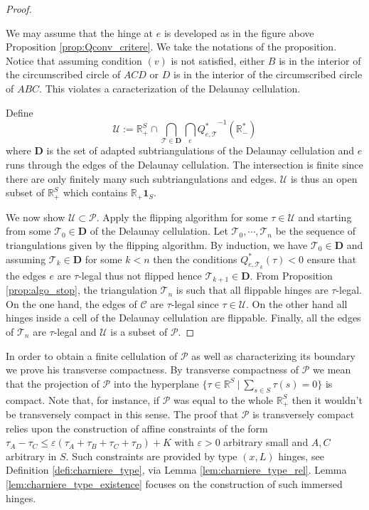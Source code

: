 \documentclass[a4paper,12pt]{article}
\def\U{\mathcal U}
\def\TT{\mathcal T}
\def\adm{\P}
\def\RR{\mathbb{R}}
\def\Cell{\mathcal C}
\def\U{\mathcal{U}}
\def\adm{\mathcal{P}}
\def\P{\mathcal{P}}
\theoremstyle{definition}
\begin{document}
\begin{proof}
\begin{itemize}
					 We may assume that the hinge at $e$ is developed as in the figure above Proposition \ref{prop:Qconv_critere}. We take the notations of the proposition.  Notice that assuming condition $(v)$ is not satisfied,  either $B$ is in the interior of the circumscribed circle of $ACD$ or $D$ is in the interior of the circumscribed circle of $ABC$. This violates a caracterization of the Delaunay cellulation.
					\end{itemize}
                    
					Define $$\U:=\RR_+^S\cap \bigcap_{\TT\in \mathbf{D}}\bigcap_e {Q^*_{e,\TT}}^{-1}(\RR_-^*)$$
					where $\mathbf{D}$ is the set of adapted subtriangulations of the Delaunay cellulation and $e$ runs through the edges of the Delaunay cellulation. The intersection is finite since there are only finitely many such subtriangulations and edges.
					$\U$ is thus an open subset of $\RR^S_+$ which contains $\RR_+ \mathbf{1}_S$.
					
					We now show $\U\subset \adm$. Apply the flipping algorithm for some $\tau\in \U$ and starting from some $\TT_0\in \mathbf{D}$ of the Delaunay cellulation. Let $\TT_0,\cdots,\TT_n$ be the sequence of triangulations given by the flipping algorithm.
					By induction, we have  $\TT_0\in\mathbf{D}$ and assuming $\TT_k\in \mathbf D$ for some $k<n$ then the conditions $Q_{e,\TT_k}^*(\tau)<0$ ensure that the edges $e$ are $\tau$-legal thus not flipped hence $\TT_{k+1}\in \mathbf{D}$. 
				From Proposition \ref{prop:algo_stop}, the triangulation $\TT_n$ is such that all flippable hinges are $\tau$-legal. On the one hand, the edges of $\Cell$ are $\tau$-legal since $\tau\in \U$. On the other hand all hinges inside a cell of the Delaunay cellulation are flippable. Finally, all the edges of $\TT_n$ are $\tau$-legal and 
				$\U$ is a subset of $\adm$.
				\end{proof}

				
				In order to obtain a finite cellulation of $\adm$ as well as characterizing its boundary we prove his transverse compactness.
				By transverse compactness of $\adm$ we mean that the projection of $\adm$ into the hyperplane $\{\tau\in \RR^S~|~\sum_{s\in S}\tau(s) = 0 \}$ is compact. Note that, for instance, if $\adm $ was equal to the whole $\RR_+^S$ then it wouldn't be transversely compact in this sense. The proof that $\adm$ is transversely compact relies upon the construction of affine constraints of the form $\tau_A-\tau_C\leq \varepsilon (\tau_A+\tau_B+\tau_C+\tau_D) + K$ with $\varepsilon>0$ arbitrary small and $A,C$ arbitrary in $S$.
				Such constraints are provided by type $(x,L)$ hinges, see Definition \ref{defi:charniere_type}, via Lemma \ref{lem:charniere_type_rel}. Lemma \ref{lem:charniere_type_existence} focuses on the construction of such immersed hinges.
\end{document}
